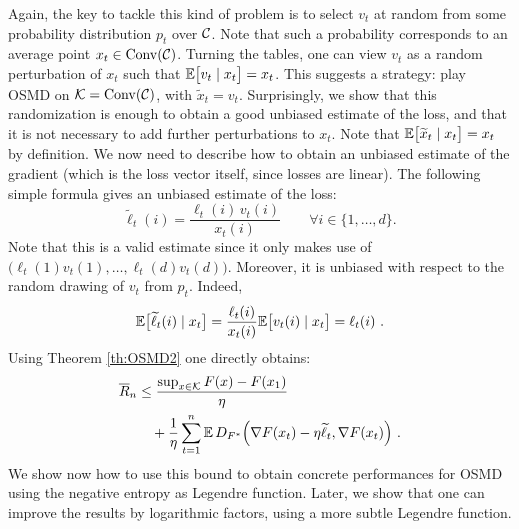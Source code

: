 Again, the key to tackle this kind of problem is to select $v_t$ at random from some probability distribution $p_t$ over $\mathcal{C}$. Note that such a probability corresponds to an average point $x_t \in \mathrm{Conv}(\mathcal{C})$. Turning the tables, one can view $v_t$ as a random perturbation of $x_t$ such that $\mathbb{E}\bigl[v_t \mid x_t\bigr] = x_t$. This suggests a strategy: play OSMD on $\mathcal{K}=\mathrm{Conv}(\mathcal{C})$, with $\tilde{x}_t = v_t$. Surprisingly, we show that this randomization is enough to obtain a good unbiased estimate of the loss, and that it is not necessary to add further perturbations to $x_t$. Note that $\mathbb{E}\bigl[\widetilde{x}_t \mid x_t\bigr] = x_t$ by definition. We now need to describe how to obtain an unbiased estimate of the gradient (which is the loss vector itself, since losses are linear). The following simple formula gives an unbiased estimate of the loss:
\begin{equation} \label{eq:semibanditestimate}
\tilde{\ell}_t(i) = \frac{\ell_t(i)\,v_t(i)}{x_t(i)} \qquad \forall i \in \{1,\hdots, d\} .
\end{equation}
Note that this is a valid estimate since it only makes use of $\bigl(\ell_t(1) v_t(1), \hdots, \ell_t(d) v_t(d)\bigr)$. Moreover, it is unbiased with respect to the random drawing of $v_t$ from $p_t$. Indeed,
\[
    \mathbb{E}\bigl[\widetilde{\ell}_t(i) \mid x_t\bigr] = \frac{\ell_t(i)}{x_t(i)}\mathbb{E}\bigl[v_t(i) \mid x_t\bigr] = \ell_t(i)~.
\]
Using Theorem \ref{th:OSMD2} one directly obtains:
\begin{align}
\nonumber
    \overline{R}_n
&\le
    \frac{\sup_{x \in \mathcal{K}} F(x) - F(x_1)}{\eta}
\\ &\quad + \frac{1}{\eta} \sum_{t=1}^n \mathbb{E}\, D_{F^*}\Bigl(\nabla F(x_t) - \eta \widetilde{\ell}_t, \label{eq:semibanditregret}
\nabla F(x_t)\Bigr)~.
\end{align}
We show now how to use this bound to obtain concrete performances for OSMD using the negative entropy as Legendre function. Later, we show that one can improve the results by logarithmic factors, using a more subtle Legendre function.
